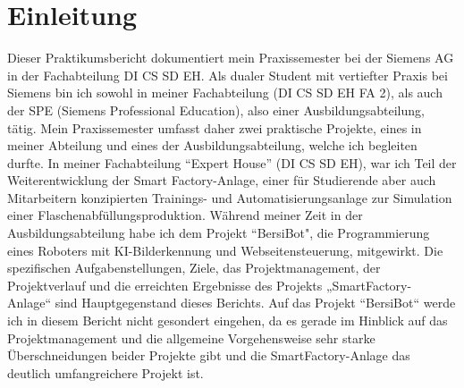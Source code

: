 \chapter{Einleitung}\label{ch:data}

\label{sec:Einleitung}

Dieser Praktikumsbericht dokumentiert mein Praxissemester bei der Siemens AG in der Fachabteilung DI CS SD EH.
Als dualer Student mit vertiefter Praxis bei Siemens bin ich sowohl in meiner Fachabteilung (DI CS SD EH FA 2), als auch der SPE  
(Siemens Professional Education), also einer Ausbildungsabteilung, tätig.
Mein Praxissemester umfasst daher zwei praktische Projekte, eines in meiner Abteilung und eines der Ausbildungsabteilung, welche ich begleiten 
durfte. In meiner Fachabteilung “Expert House” (DI CS SD EH), war ich Teil der Weiterentwicklung der Smart Factory-Anlage, einer für 
Studierende aber auch Mitarbeitern konzipierten Trainings- und Automatisierungsanlage zur Simulation einer Flaschenabfüllungsproduktion. Während meiner Zeit in der 
Ausbildungsabteilung habe ich dem Projekt “BersiBot", die Programmierung eines Roboters mit KI-Bilderkennung und Webseitensteuerung, mitgewirkt.
Die spezifischen Aufgabenstellungen, Ziele, das Projektmanagement,
der Projektverlauf und die erreichten Ergebnisse des Projekts „SmartFactory-
Anlage“ sind Hauptgegenstand dieses Berichts. Auf das Projekt “BersiBot“ werde
ich in diesem Bericht nicht gesondert eingehen, da es gerade im Hinblick auf das
Projektmanagement und die allgemeine Vorgehensweise sehr starke
Überschneidungen beider Projekte gibt und die SmartFactory-Anlage das deutlich
umfangreichere Projekt ist.

